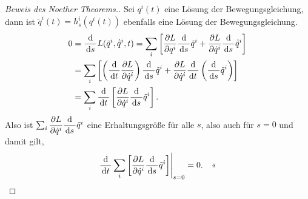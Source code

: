 \begin{proof}[Beweis des Noether Theorems.]
Sei $q^i(t)$ eine Lösung der Bewegungsgleichung, dann ist $\tilde{q}^i(t) =
h_s^i(q^i(t))$ ebenfalls eine Lösung der Bewegungsgleichung.
\begin{align*}
0 &= \frac{\mathrm{d}}{\,\mathrm{d} s\,}L(\tilde{q}^i,\dot{\tilde{q}}^i,t)
= \sum_i \left[\frac{\partial L}{\partial q^i}\frac{\mathrm{d}}{\,\mathrm{d} s\,} \tilde{q}^i +
\frac{\partial L}{\partial \dot{q}^i}\frac{\mathrm{d}}{\,\mathrm{d} s\,}\dot{\tilde{q}}^i
\right]\\ &= \sum_i \left[\left(\frac{\mathrm{d}}{\,\mathrm{d} t\,}\frac{\partial L}{\partial
\dot{q}^i}\right)\frac{\mathrm{d}}{\,\mathrm{d} s\,}\tilde{q}^i + \frac{\partial
L}{\partial \dot{q}^i}\frac{\mathrm{d}}{\,\mathrm{d} t\,}\left(\frac{\mathrm{d}}{\,\mathrm{d} s\,}\tilde{q}^i
\right) \right]\\
&= \sum_i \frac{\mathrm{d}}{\,\mathrm{d} t\,} \left[\frac{\partial L}{\partial
\dot{q}^i}\frac{\mathrm{d}}{\,\mathrm{d} s\,}\tilde{q}^i \right].
\end{align*}
Also ist $\sum_i\dfrac{\partial L}{\partial
\dot{q}^i}\dfrac{\mathrm{d}}{\,\mathrm{d} s\,}\tilde{q}^i$ eine Erhaltungsgröße für alle $s$, also auch für $s=0$ und damit gilt,
\begin{align*}
\left.\frac{\mathrm{d}}{\,\mathrm{d} t\,} \sum_i\left[\frac{\partial L}{\partial
\dot{q}^i}\frac{\mathrm{d}}{\,\mathrm{d} s\,}\tilde{q}^i \right]\right|_{s=0} = 0.\quad\text{<<}
\end{align*}
\end{proof}

